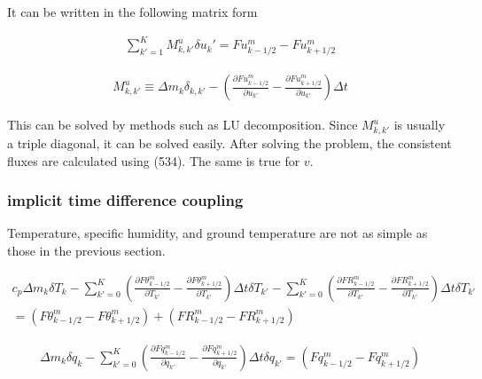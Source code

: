 It can be written in the following matrix form

\begin{eqnarray}
  \sum_{k'=1}^{K} M^u_{k,k'} \delta u_k' = Fu^{m}_{k-1/2} - Fu^{m}_{k+1/2}
\end{eqnarray}

\begin{eqnarray}
M^u_{k,k'} \equiv \Delta m_k \delta_{k,k'}
          -  \left(  \frac{\partial{Fu^{m}_{k-1/2}}}{\partial {u_{k'}}}
                   - \frac{\partial{Fu^{m}_{k+1/2}}}{\partial {u_{k'}}} \right) \Delta t
\end{eqnarray}

This can be solved by methods such as LU decomposition. Since \(M^u_{k,k'}\) is usually a triple diagonal, it can be solved easily. After solving the problem, the consistent fluxes are calculated
using (534). The same is true for \(v\).

\hypertarget{implicit-time-difference-coupling}{%
\subsubsection{implicit time difference coupling}\label{implicit-time-difference-coupling}}

Temperature, specific humidity, and ground temperature are not as simple as those in the previous section.

\begin{eqnarray}
  c_p \Delta m_k \delta T_k
   -  \sum_{k'=0}^{K}
                 \left(  \frac{\partial{F\theta^{m}_{k-1/2}}}{\partial {T_{k'}}}
                       - \frac{\partial{F\theta^{m}_{k+1/2}}}{\partial {T_{k'}}} \right)
                 \Delta t\delta T_{k'}
  - \sum_{k'=0}^{K}
                 \left(  \frac{\partial{FR^{m}_{k-1/2}}}{\partial {T_{k'}}}
                       - \frac{\partial{FR^{m}_{k+1/2}}}{\partial {T_{k'}}} \right)
                 \Delta t\delta T_{k'}  \\
  =   ( F\theta^{m}_{k-1/2} - F\theta^{m}_{k+1/2} )
  + ( FR^{m}_{k-1/2} - FR^{m}_{k+1/2} )
\end{eqnarray}

\begin{eqnarray}
  \Delta m_k \delta q_k
  -  \sum_{k'=0}^{K} \left(  \frac{\partial{Fq^{m}_{k-1/2}}}{\partial {q_{k'}}}
                            - \frac{\partial{Fq^{m}_{k+1/2}}}{\partial {q_{k'}}} \right)
                 \Delta t\delta q_{k'}
  = ( Fq^{m}_{k-1/2} - Fq^{m}_{k+1/2} )
\end{eqnarray}


